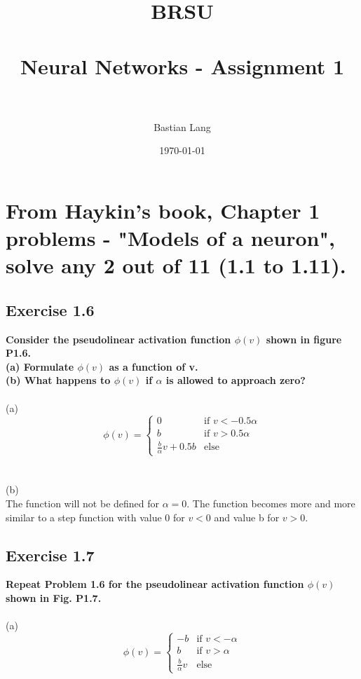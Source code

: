 \documentclass[paper=a4, fontsize=11pt]{scrartcl} %
\title{	
\normalfont \normalsize 
\textsc{BRSU} \\ [25pt] %
\horrule{0.5pt} \\[0.4cm] %
\huge Neural Networks - Assignment 1 \\ %
\horrule{2pt} \\[0.5cm] %
}
\author{Bastian Lang} %
\date{\normalsize\today} %
\numberwithin{equation}{section} %
\numberwithin{figure}{section} %
\numberwithin{table}{section} %
\begin{document}
\maketitle %

\section{From Haykin's book, Chapter 1 problems - "Models of a neuron", solve any 2 out of 11
(1.1 to 1.11).}

\subsection{Exercise 1.6}
\textbf{Consider the pseudolinear activation function $\phi(v)$ shown in figure P1.6.\\
(a) Formulate $\phi(v)$ as a function of v.\\
(b) What happens to $\phi(v)$ if $\alpha$ is allowed to approach zero?}\\\\
 
(a)\\
\[ \phi(v) =
\left\{
	\begin{array}{ll}
		0  & \mbox{if } v < -0.5\alpha \\
		b & \mbox{if } v > 0.5\alpha \\
		\frac{b}{\alpha}v + 0.5b & \mbox{else}
	\end{array}
\right.\]\\\\

(b)\\
The function will not be defined for $\alpha =0$. The function becomes more and more similar to a step function with value 0 for $v<0$ and value b for $v>0$.

\subsection{Exercise 1.7}
\textbf{Repeat Problem 1.6 for the pseudolinear activation function $\phi(v)$ shown in Fig. P1.7.}\\\\

(a)\\
\[ \phi(v) =
\left\{
	\begin{array}{ll}
		-b  & \mbox{if } v < -\alpha \\
		b & \mbox{if } v > \alpha \\
		\frac{b}{\alpha}v & \mbox{else}
	\end{array}
\right.\]\\\\
\end{document}

